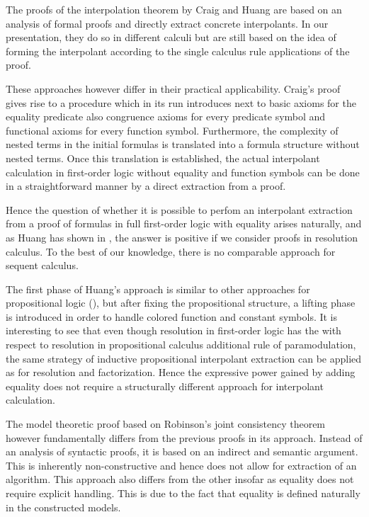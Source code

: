 The proofs of the interpolation theorem by Craig and Huang are based on an analysis of formal proofs and directly extract concrete interpolants.
In our presentation, they do so in different calculi but are still based on the idea of forming the interpolant according to the single calculus rule applications of the proof.

These approaches however differ in their practical applicability. 
Craig's proof gives rise to a procedure which in its run introduces next to basic axioms for the equality predicate also congruence axioms for every predicate symbol and functional axioms for every function symbol.
Furthermore, the complexity of nested terms in the initial formulas is translated into a formula structure without nested terms.
Once this translation is established, the actual interpolant calculation in first-order logic without equality and function symbols can be done in a straightforward manner by a direct extraction from a proof.

Hence the question of whether it is possible to perfom an interpolant extraction from a proof of formulas in full first-order logic with equality arises naturally, and as Huang has shown in \cite{Huang95}, the answer is positive if we consider proofs in resolution calculus.
To the best of our knowledge, there is no comparable approach for sequent calculus.

The first phase of Huang's approach is similar to other approaches for propositional logic (\cite{krajivcek1997interpolation,Pudlak97,McMillan03}),
but after fixing the propositional structure, a lifting phase is introduced in order to handle colored function and constant symbols.
It is interesting to see that even though resolution in first-order logic has the with respect to resolution in propositional calculus additional rule of paramodulation, the same strategy of inductive propositional interpolant extraction can be applied as for resolution and factorization.
Hence the expressive power gained by adding equality does not require a structurally different approach for interpolant calculation.



The model theoretic proof based on Robinson's joint consistency theorem however fundamentally differs from the previous proofs in its approach.
Instead of an analysis of syntactic proofs, it is based on an indirect and semantic argument.
This is inherently non-constructive and hence does not allow for extraction of an algorithm.
This approach also differs from the other insofar as equality does not require explicit handling. This is due to the fact that equality is defined naturally in the constructed models.





